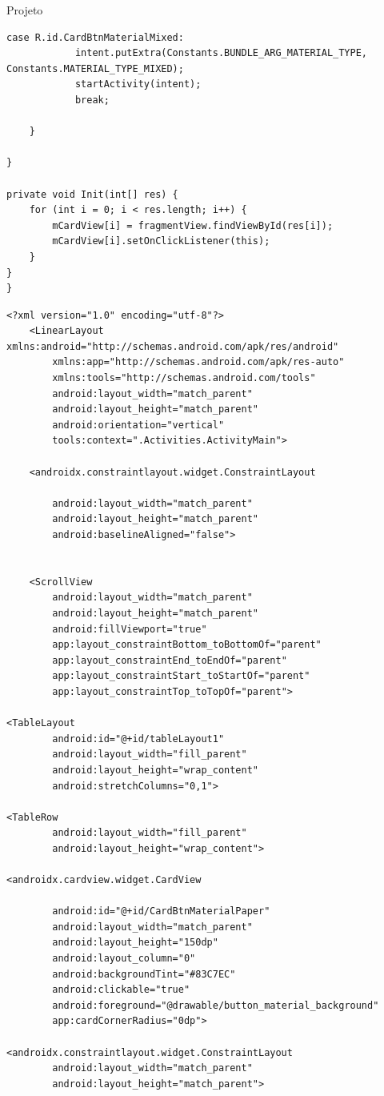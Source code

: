 \documentclass[
	12pt,				%
	openright,			%
	twoside,			%
	a4paper,			%
	english,			%
	french,				%
	spanish,			%
	brazil				%
	]{abntex2}
\begin{document}
\begin{chapter}{Projeto}
\begin{lstlisting}[numbers=none,
basicstyle=\small,
caption={FragmentMaterialMenu.java},
title={FragmentMaterialMenu.java},
label={FragmentMaterialMenu.java}]
		case R.id.CardBtnMaterialMixed:
			intent.putExtra(Constants.BUNDLE_ARG_MATERIAL_TYPE, Constants.MATERIAL_TYPE_MIXED);
			startActivity(intent);
			break;

	}

}

private void Init(int[] res) {
	for (int i = 0; i < res.length; i++) {
		mCardView[i] = fragmentView.findViewById(res[i]);
		mCardView[i].setOnClickListener(this);
	}
}
}
\end{lstlisting}

\begin{lstlisting}[numbers=none,basicstyle=\small,
caption={FragmentMaterialMenu.xml},
title={FragmentMaterialMenu.xml},
label={fragment_material_menu.xml}]
    <?xml version="1.0" encoding="utf-8"?>
    <LinearLayout xmlns:android="http://schemas.android.com/apk/res/android"
		xmlns:app="http://schemas.android.com/apk/res-auto"
		xmlns:tools="http://schemas.android.com/tools"
		android:layout_width="match_parent"
		android:layout_height="match_parent"
		android:orientation="vertical"
		tools:context=".Activities.ActivityMain">

    <androidx.constraintlayout.widget.ConstraintLayout

		android:layout_width="match_parent"
		android:layout_height="match_parent"
		android:baselineAligned="false">


    <ScrollView
		android:layout_width="match_parent"
		android:layout_height="match_parent"
		android:fillViewport="true"
		app:layout_constraintBottom_toBottomOf="parent"
		app:layout_constraintEnd_toEndOf="parent"
		app:layout_constraintStart_toStartOf="parent"
		app:layout_constraintTop_toTopOf="parent">

<TableLayout
		android:id="@+id/tableLayout1"
		android:layout_width="fill_parent"
		android:layout_height="wrap_content"
		android:stretchColumns="0,1">

<TableRow
		android:layout_width="fill_parent"
		android:layout_height="wrap_content">

<androidx.cardview.widget.CardView

		android:id="@+id/CardBtnMaterialPaper"
		android:layout_width="match_parent"
		android:layout_height="150dp"
		android:layout_column="0"
		android:backgroundTint="#83C7EC"
		android:clickable="true"
		android:foreground="@drawable/button_material_background"
		app:cardCornerRadius="0dp">

<androidx.constraintlayout.widget.ConstraintLayout
		android:layout_width="match_parent"
		android:layout_height="match_parent">


\end{lstlisting}
\end{chapter}
\end{document}
